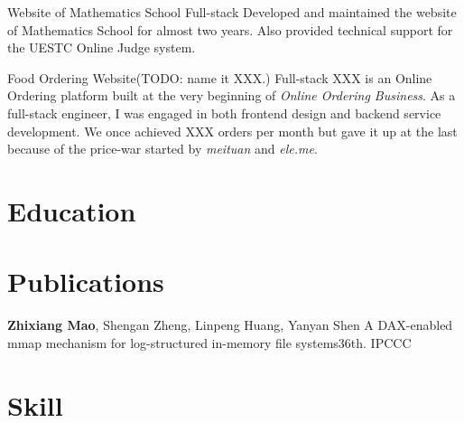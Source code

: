 \documentclass[11pt,a4paper]{moderncv}
\begin{document}
{Website of Mathematics School }
{Full-stack}
{}{}{
	Developed and maintained the website of Mathematics School for almost two years. Also provided technical support for the UESTC Online Judge system.
}

{Food Ordering Website(TODO: name it XXX.)}
{Full-stack}
{}{}{
	XXX is an Online Ordering platform built at the very beginning of \textit{Online Ordering Business}. As a full-stack
	engineer, I was engaged in both frontend design and backend service development. We once achieved XXX orders per month but gave it up at the last because of the price-war started by \textit{meituan} and \textit{ele.me}.
}

\section{Education}

\section{Publications}
{\textbf{Zhixiang Mao}\textnormal{, Shengan Zheng, Linpeng Huang, Yanyan Shen}}
{A DAX-enabled mmap mechanism for log-structured in-memory file systems}{36th. IPCCC}
{}{}{}

\section{Skill}



\end{document}
